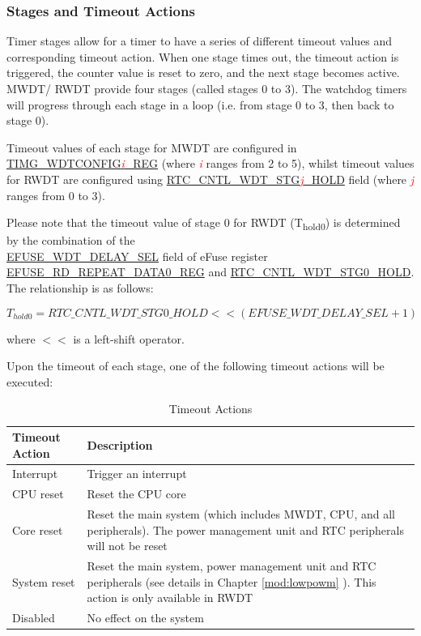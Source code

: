 \documentclass[main\_\_EN.tex]{subfiles}
\begin{document}
\subsubsection{Stages and Timeout Actions}\label{sec:wdt-timeout}
Timer stages allow for a timer to have a series of different timeout values and corresponding timeout action. When one stage times out, the timeout action is triggered, the counter value is reset to zero, and the next stage becomes active. MWDT/ RWDT provide four stages (called stages 0 to 3). The watchdog timers will progress through each stage in a loop (i.e. from stage 0 to 3, then back to stage 0).

Timeout values of each stage for MWDT are configured in \hyperref[regdesc:TIMGWDTCONFIG2REG]{TIMG\_WDTCONFIG\textcolor{red}{\it{i}}\_REG} (where \textcolor{red}{\it{i}} ranges from 2 to 5), whilst timeout values for RWDT are configured using \hyperref[fielddesc:RTCCNTLWDTSTG3]{RTC\_CNTL\_WDT\_STG\textcolor{red}{\it{j}}\_HOLD} field (where \textcolor{red}{\it{j}} ranges from 0 to 3).

Please note that the timeout value of stage 0 for RWDT (T\textsubscript{hold0}) is determined by the combination of the \\ \hyperref[fielddesc:EFUSEWDTDELAYSEL]{EFUSE\_WDT\_DELAY\_SEL} field of eFuse register \hyperref[regdesc:EFUSERDREPEATDATA0REG]{EFUSE\_RD\_REPEAT\_DATA0\_REG} and \hyperref[fielddesc:RTCCNTLWDTSTG0HOLD]{RTC\_CNTL\_WDT\_STG0\_HOLD}. The relationship is as follows:

\begin{displaymath}
T_{hold0} = \hyperref[fielddesc:RTCCNTLWDTSTG0HOLD]{RTC\_CNTL\_WDT\_STG0\_HOLD}   << (\hyperref[fielddesc:EFUSEWDTDELAYSEL]{EFUSE\_WDT\_DELAY\_SEL} + 1)
\end{displaymath}

where $<<$ is a left-shift operator.

Upon the timeout of each stage, one of the following timeout actions will be executed:

\begin{table}[H]
\centering
\caption{Timeout Actions}
\label{tab:wdt-timeout-action}

\begin{tabular}{|l|m{12cm}|}
\hline
\rowcolor{lightgray}
    \textbf{Timeout Action} & \textbf{Description} \\\hline

    Interrupt &  Trigger an interrupt \\ \hline
    CPU reset &  Reset the CPU core \\ \hline
    Core reset &  Reset the main system (which includes MWDT, CPU, and all peripherals). The power management unit and RTC peripherals will not be reset \\ \hline
    System reset &  Reset the main system, power management unit and RTC peripherals (see details in Chapter \ref{mod:lowpowm} \textit{\nameref{mod:lowpowm}}). This action is only available in RWDT  \\ \hline
    Disabled &  No effect on the system \\ \hline

\end{tabular}
\end{table}
\end{document}
